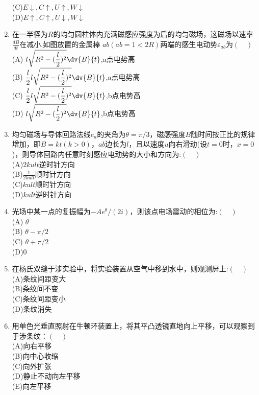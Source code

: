 \begin{enumerate}
(C)$E \downarrow ,C\uparrow ,U\uparrow  ,W\downarrow$\\
(D)$E \uparrow ,C\uparrow ,U\downarrow  ,W\downarrow$\\
\item 在一半径为$R$的均匀圆柱体内充满磁感应强度为后的均匀磁场，这磁场以速率$\frac{dB}{dt}$在减小,如图放置的金属棒 $ab(ab=1<2R)$两端的感生电动势$\varepsilon_{ab}$为$(\quad)$\\
(A) $\displaystyle l \sqrt{R^2-(\frac{l}{2})^2}\dv{B}{t}$,a点电势高\\
(B) $\displaystyle \frac{l}{2}l \sqrt{R^2-(\frac{l}{2})^2}\dv{B}{t}$,a点电势高\\
(C) $\displaystyle \frac{l}{2}l \sqrt{R^2-(\frac{l}{2})^2}\dv{B}{t}$,b点电势高\\
(D) $\displaystyle l \sqrt{R^2-(\frac{l}{2})^2}\dv{B}{t}$,b点电势高\\
\item 均匀磁场与导体回路法线$e_a$的夹角为$\theta=\pi/3$，磁感强度$B$随时间按正比的规律增加，即$B=kt(k>0)$，$ab$边长为$l$，且以速度$u$向右滑动(设$t=0$时，$x=0$)，则导体回路内任意时刻感应电动势的大小和方向为:$(\quad)$\\
(A)$\displaystyle 2kult$逆时针方向\\
(B)$\displaystyle \frac{1}{2kult}$顺时针方向\\
(C)$kult$顺时针方向\\
(D)$kult$逆时针方向
\item 光场中某一点的复振幅为$-Ae^\theta/(2i)$，则该点电场震动的相位为:$(\quad)$\\
(A) $\theta$\\
(B) $\theta-\pi/2$\\
(C) $\theta+\pi/2$\\
(D)0
\item 在杨氏双缝于涉实验中，将实验装置从空气中移到水中，则观测屏上:$(\quad)$\\
(A)条纹间距变大\\
(B)条纹间不变 \\
(C)条纹间距变小\\
(D)条纹消失\\
\item 用单色光垂直照射在牛顿环装置上，将其平凸透镜直地向上平移，可以观察到于涉条纹：$(\quad)$\\
(A)向右平移\\
 (B)向中心收缩 \\
 (C)向外扩张\\
(D)静止不动向左平移\\
(E)向左平移

\end{enumerate}
